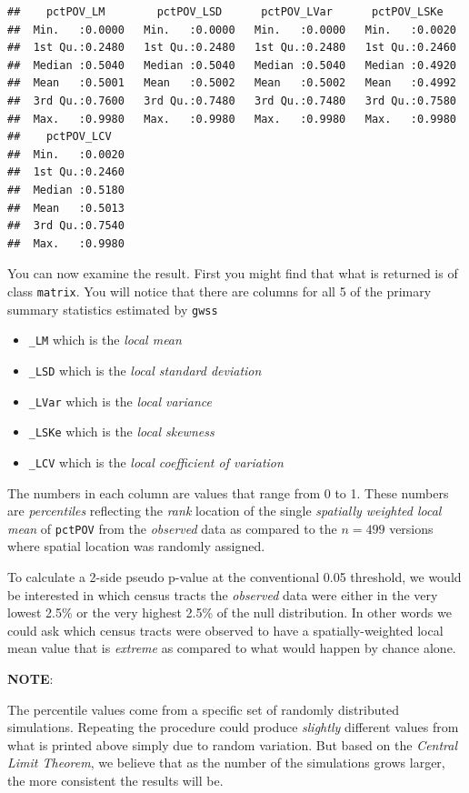 \documentclass[
]{book}
\providecommand{\tightlist}{%
  \setlength{\itemsep}{0pt}\setlength{\parskip}{0pt}}
\newenvironment{rmdnote}[1]
  {
  \begin{itemize}
  \renewcommand{\labelitemi}{
    \raisebox{-.7\height}[0pt][0pt]{
      {\setkeys{Gin}{width=3em,keepaspectratio}\texttt{[image: images/\#1]}}
    }
  }
  \setlength{\fboxsep}{1em}
  \begin{note}
  \item
  }
  {
  \end{note}
  \end{itemize}
  }
\begin{document}
\begin{verbatim}
##    pctPOV_LM        pctPOV_LSD      pctPOV_LVar      pctPOV_LSKe    
##  Min.   :0.0000   Min.   :0.0000   Min.   :0.0000   Min.   :0.0020  
##  1st Qu.:0.2480   1st Qu.:0.2480   1st Qu.:0.2480   1st Qu.:0.2460  
##  Median :0.5040   Median :0.5040   Median :0.5040   Median :0.4920  
##  Mean   :0.5001   Mean   :0.5002   Mean   :0.5002   Mean   :0.4992  
##  3rd Qu.:0.7600   3rd Qu.:0.7480   3rd Qu.:0.7480   3rd Qu.:0.7580  
##  Max.   :0.9980   Max.   :0.9980   Max.   :0.9980   Max.   :0.9980  
##    pctPOV_LCV    
##  Min.   :0.0020  
##  1st Qu.:0.2460  
##  Median :0.5180  
##  Mean   :0.5013  
##  3rd Qu.:0.7540  
##  Max.   :0.9980
\end{verbatim}

You can now examine the result. First you might find that what is returned is of class \texttt{matrix}. You will notice that there are columns for all 5 of the primary summary statistics estimated by \texttt{gwss}

\begin{itemize}
\tightlist
\item
  \texttt{\_LM} which is the \emph{local mean}
\item
  \texttt{\_LSD} which is the \emph{local standard deviation}
\item
  \texttt{\_LVar} which is the \emph{local variance}
\item
  \texttt{\_LSKe} which is the \emph{local skewness}
\item
  \texttt{\_LCV} which is the \emph{local coefficient of variation}
\end{itemize}

The numbers in each column are values that range from 0 to 1. These numbers are \emph{percentiles} reflecting the \emph{rank} location of the single \emph{spatially weighted local mean} of \texttt{pctPOV} from the \emph{observed} data as compared to the \(n=499\) versions where spatial location was randomly assigned.

To calculate a 2-side pseudo p-value at the conventional 0.05 threshold, we would be interested in which census tracts the \emph{observed} data were either in the very lowest 2.5\% or the very highest 2.5\% of the null distribution. In other words we could ask which census tracts were observed to have a spatially-weighted local mean value that is \emph{extreme} as compared to what would happen by chance alone.

\begin{rmdnote}{note}
\textbf{NOTE}:

The percentile values come from a specific set of randomly distributed simulations. Repeating the procedure could produce \emph{slightly} different values from what is printed above simply due to random variation. But based on the \emph{Central Limit Theorem}, we believe that as the number of the simulations grows larger, the more consistent the results will be.

\end{rmdnote}
\end{document}
